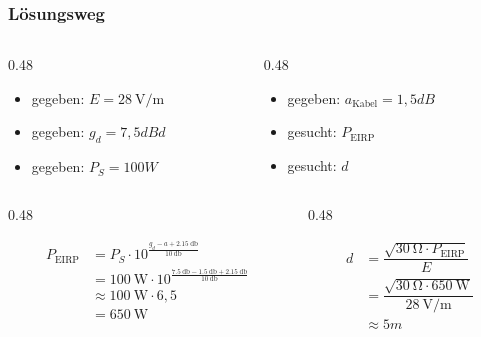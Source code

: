 \begin{frame}
    \frametitle{Lösungsweg}
    \begin{columns}
        \begin{column}{0.48\textwidth}
            \begin{itemize}
                \item gegeben: $E = \qty{28}{\volt\per\metre}$
                \item gegeben: $g_d = 7,5dBd$
                \item gegeben: $P_S = 100W$
            \end{itemize}

        \end{column}
        \begin{column}{0.48\textwidth}
            \begin{itemize}
                \item gegeben: $a_{\textrm{Kabel}} = 1,5dB$
                \item gesucht: $P_{\textrm{EIRP}}$
                \item gesucht: $d$
            \end{itemize}

        \end{column}
    \end{columns}
    \begin{columns}
        \begin{column}{0.48\textwidth}

            \pause
            \begin{equation*}
                \begin{split}
                    P_{\textrm{EIRP}} & = P_S \cdot 10^{\frac{g_d - a + \qty{2,15}{\decibel}}{\qty{10}{\decibel}}}\\
                                      & = \qty{100}{\watt} \cdot 10^{\frac{\qty{7,5}{\decibel} - \qty{1,5}{\decibel} + \qty{2,15}{\decibel}}{\qty{10}{\decibel}}}\\
                                      & \approx \qty{100}{\watt} \cdot 6,5\\ &= \qty{650}{\watt} 
                \end{split}
            \end{equation*}
        \end{column}
        \begin{column}{0.48\textwidth}

            \pause
            \begin{equation}
                \begin{split}
                    \nonumber d &= \dfrac{\sqrt{\qty{30}{\ohm} \cdot P_{\text{EIRP}}}}{E}\\
                                &= \dfrac{\sqrt{\qty{30}{\ohm} \cdot \qty{650}{\watt}}}{\qty{28}{\volt\per\metre}}\\
                                &\approx 5m
                \end{split}
            \end{equation}
        \end{column}
    \end{columns}


\end{frame}
